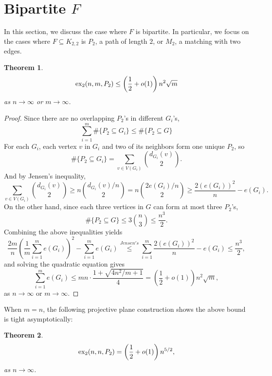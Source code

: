 \documentclass[12pt]{report}
\newtheorem{theorem}{Theorem}[chapter]
\newcommand*{\dex}{\textnormal{ex}_2}
\begin{document}
\section{Bipartite $F$}

In this section, we discuss the case where $F$ is bipartite. In particular, we focus on the cases where $F \subseteq K_{2, 2}$ is $P_2$, a path of length $2$, or $M_2$, a matching with two edges.

\begin{theorem}
  \[
    \dex(n, m, P_2) \leq \left(\frac{1}{2} + o(1)\right)n^{2}\sqrt{m}
  \]
  as $n \to \infty$ or $m \to \infty$.
\end{theorem}

\begin{proof}
  Since there are no overlapping $P_2$'s in different $G_i$'s, 
  \[
    \sum_{i = 1}^m \#\{P_2 \subseteq G_i\} \leq \#\{P_2 \subseteq G\}
  \]
  For each $G_i$, each vertex $v$ in $G_i$ and two of its neighbors form one unique $P_2$, so
  \[
    \#\{P_2 \subseteq G_i\} = \sum_{v \in V(G_i)} \binom{d_{G_i}(v)}{2}.
  \]
  And by Jensen's inequality,
  \[
    \sum_{v \in V(G_i)} \binom{d_{G_i}(v)}{2} \geq n\binom{d_{G_i}(v)/n}{2} = n\binom{2e(G_i)/n}{2} \geq \frac{2(e(G_i))^2}{n} - e(G_i).
  \]
  On the other hand, since each three vertices in $G$ can form at most three $P_2$'s, 
  \[
    \#\{P_2 \subseteq G\} \leq 3\binom{n}{3} \leq \frac{n^3}{2}.
  \]
  Combining the above inequalities yields
  \[
    \frac{2m}{n}\left(\frac{1}{m}\sum_{i = 1}^m e(G_i)\right)^2 - \sum_{i = 1}^m e(G_i) \overset{Jensen's}{\leq} \sum_{i = 1}^m \frac{2(e(G_i))^2}{n} - e(G_i) \leq \frac{n^3}{2},
  \]
  and solving the quadratic equation gives
  \[
    \sum_{i = 1}^m e(G_i) \leq mn \cdot \frac{1 + \sqrt{4n^2/m + 1}}{4} =  \left(\frac{1}{2} + o(1)\right)n^{2}\sqrt{m},
  \]
  as $n \to \infty$ or $m \to \infty$.
\end{proof}

When $m = n$, the following projective plane construction shows the above bound is tight asymptotically:

\begin{theorem}
  \[
    \dex(n, n, P_2) = \left(\frac{1}{2} + o(1)\right)n^{5/2},
  \]
  as $n \to \infty$. 
\end{theorem}
\end{document}
